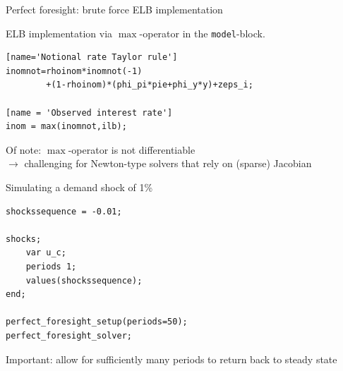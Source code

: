 
\begin{frame}[fragile]{Perfect foresight: brute force ELB implementation}
\begin{wideitemize}
\item ELB implementation via $\max$-operator in the \texttt{model}-block.
\begin{verbatim}
[name='Notional rate Taylor rule']
inomnot=rhoinom*inomnot(-1)
        +(1-rhoinom)*(phi_pi*pie+phi_y*y)+zeps_i;

[name = 'Observed interest rate']
inom = max(inomnot,ilb);
\end{verbatim}
\item Of note: $\max$-operator is not differentiable\\
$\rightarrow$ challenging for Newton-type solvers that rely on (sparse) Jacobian
\end{wideitemize}
\end{frame}


\begin{frame}[fragile]{Simulating a demand shock of 1\%}
\begin{verbatim}
shockssequence = -0.01;

shocks;
    var u_c;
    periods 1;
    values(shockssequence);
end;

perfect_foresight_setup(periods=50);
perfect_foresight_solver;
\end{verbatim}
\begin{wideitemize}
\item Important: allow for sufficiently many periods to return back to steady state
\end{wideitemize}
\end{frame}


